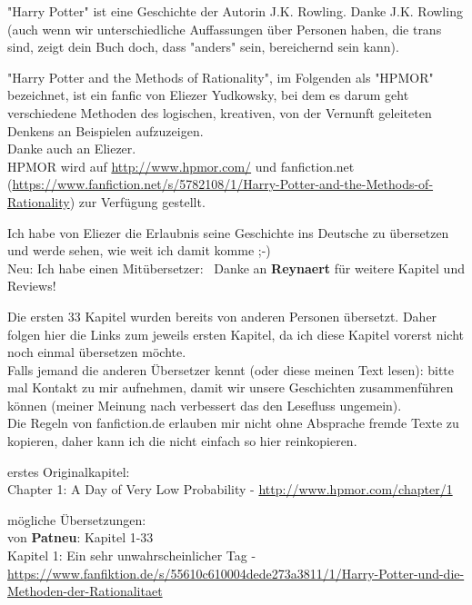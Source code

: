 

\hypertarget{vorwort-der-uxfcbersetzerin}{%

"Harry Potter" ist eine Geschichte der Autorin J.K. Rowling. Danke J.K. Rowling (auch wenn wir unterschiedliche Auffassungen über Personen haben, die trans sind, zeigt dein Buch doch, dass "anders" sein, bereichernd sein kann).

"Harry Potter and the Methods of Rationality", im Folgenden als "HPMOR" bezeichnet, ist ein fanfic von Eliezer Yudkowsky, bei dem es darum geht verschiedene Methoden des logischen, kreativen, von der Vernunft geleiteten Denkens an Beispielen aufzuzeigen.\\ Danke auch an Eliezer.\\ HPMOR wird auf \url{http://www.hpmor.com/} und fanfiction.net (\url{https://www.fanfiction.net/s/5782108/1/Harry-Potter-and-the-Methods-of-Rationality}) zur Verfügung gestellt.

Ich habe von Eliezer die Erlaubnis seine Geschichte ins Deutsche zu übersetzen und werde sehen, wie weit ich damit komme ;-)\\ Neu: Ich habe einen Mitübersetzer: ~Danke an \textbf{Reynaert} für weitere Kapitel und Reviews!

Die ersten 33 Kapitel wurden bereits von anderen Personen übersetzt. Daher folgen hier die Links zum jeweils ersten Kapitel, da ich diese Kapitel vorerst nicht noch einmal übersetzen möchte.\\ Falls jemand die anderen Übersetzer kennt (oder diese meinen Text lesen): bitte mal Kontakt zu mir aufnehmen, damit wir unsere Geschichten zusammenführen können (meiner Meinung nach verbessert das den Lesefluss ungemein).\\ Die Regeln von fanfiction.de erlauben mir nicht ohne Absprache fremde Texte zu kopieren, daher kann ich die nicht einfach so hier reinkopieren.

erstes Originalkapitel:\\ Chapter 1: A Day of Very Low Probability - \url{http://www.hpmor.com/chapter/1}

mögliche Übersetzungen:\\ von \textbf{Patneu}: Kapitel 1-33\\ Kapitel 1: Ein sehr unwahrscheinlicher Tag - \url{https://www.fanfiktion.de/s/55610c610004dede273a3811/1/Harry-Potter-und-die-Methoden-der-Rationalitaet}

}
